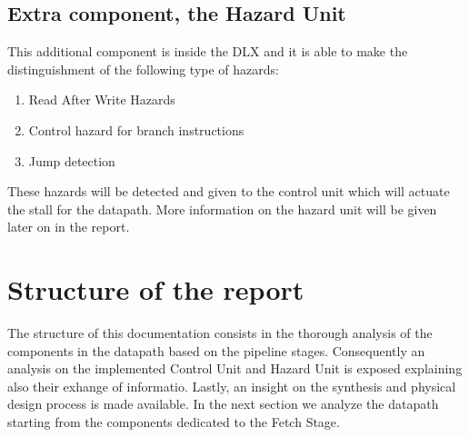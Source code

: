 		\subsection{ Extra component, the Hazard Unit }

		This additional component is inside the DLX and it is able to make the distinguishment of the following type of hazards:

		\begin{enumerate}
			\item Read After Write Hazards 
			\item Control hazard for branch instructions
			\item Jump detection
			\end{enumerate}

		These hazards will be detected and given to the control unit which will actuate the stall for the datapath. More information on the hazard unit will be given later on in the report.

		\section { Structure of the report }

		The structure of this documentation consists in the thorough analysis of the components in the datapath based on the pipeline stages. 
		Consequently an analysis on the implemented Control Unit and Hazard Unit is exposed explaining also their exhange of informatio.
		Lastly, an insight on the synthesis and physical design process is made available. In the next section we analyze the datapath starting from the components
		dedicated to the Fetch Stage.

